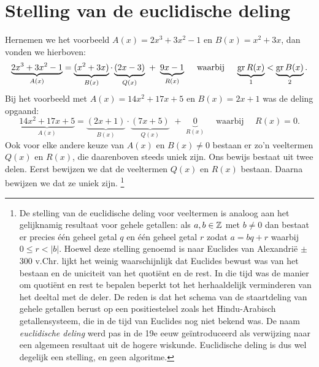 \documentclass{ximera}
\begin{document}
	\author{Koen de Naeghel - Wiskunde Op Maat}





	\section{Stelling van de euclidische deling}

	Hernemen we het voorbeeld $A(x) = 2x^3+3x^2-1$ en $B(x) = x^2+3x$, dan vonden we hierboven:
	\[
	\underbrace{2x^3+3x^2-1}_{A(x)} = \underbrace{(x^2+3x)}_{B(x)}\cdot\underbrace{(2x-3)}_{Q(x)} \,\, + \,\, \underbrace{9x-1}_{R(x)} \quad \text{ waarbij } \quad \underbrace{\operatorname{gr} R(x)}_{1} < \underbrace{\operatorname{gr} B(x)}_{2}.
	\]
	Bij het voorbeeld met $A(x) = 14x^2+17x+5$ en $B(x) = 2x+1$ was de deling opgaand:
	\[
	\underbrace{14x^2+17x+5}_{A(x)} = \underbrace{(2x+1)}_{B(x)}\cdot\underbrace{(7x+5)}_{Q(x)} \,\, + \,\, \underbrace{0}_{R(x)} \quad \text{ waarbij } \quad R(x) = 0.
	\]
	Ook voor elke andere keuze van $A(x)$ en $B(x) \neq 0$ bestaan er zo'n veeltermen $Q(x)$ en $R(x)$, die daarenboven steeds uniek zijn. Ons bewijs bestaat uit twee delen. Eerst bewijzen we dat de veeltermen $Q(x)$ en $R(x)$ bestaan. Daarna bewijzen we dat ze uniek zijn. \footnote{De stelling van de euclidische deling voor veeltermen is analoog aan het gelijknamig resultaat voor gehele getallen: als $a,b \in \mathbb{Z}$ met $b \neq 0$ dan bestaat er precies \'e\'en geheel getal $q$ en \'e\'en geheel getal $r$ zodat $a = bq + r$ waarbij $0 \leq r < \left|b\right|$. Hoewel deze stelling genoemd is naar Euclides van Alexandri\"e $\pm$300 v.Chr. lijkt het weinig waarschijnlijk dat Euclides bewust was van het bestaan en de uniciteit van het quoti\"ent en de rest. In die tijd was de manier om quoti\"ent en rest te bepalen beperkt tot het herhaaldelijk verminderen van het deeltal met de deler. De reden is dat het schema van de staartdeling van gehele getallen berust op een positiestelsel zoals het Hindu-Arabisch getallensysteem, die in de tijd van Euclides nog niet bekend was. De naam {\em euclidische deling} werd pas in de 19e eeuw ge\"introduceerd als verwijzing naar een algemeen resultaat uit de hogere wiskunde. Euclidische deling is dus wel degelijk een stelling, en geen algoritme.}
	
\end{document}
